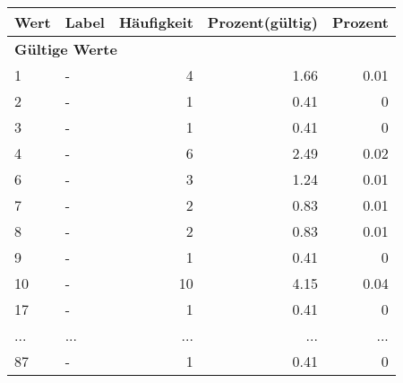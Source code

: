      \begin{longtable}{lXrrr}
     \toprule
     \textbf{Wert} & \textbf{Label} & \textbf{Häufigkeit} & \textbf{Prozent(gültig)} & \textbf{Prozent} \\
     \endhead
     \midrule
     \multicolumn{5}{l}{\textbf{Gültige Werte}}\\
        1 & \multicolumn{1}{X}{-} & %
          \num{4} &
          \num[round-mode=places,round-precision=2]{1,66} &
          \num[round-mode=places,round-precision=2]{0,01} \\
        2 & \multicolumn{1}{X}{-} & %
          \num{1} &
          \num[round-mode=places,round-precision=2]{0,41} &
          \num[round-mode=places,round-precision=2]{0} \\
        3 & \multicolumn{1}{X}{-} & %
          \num{1} &
          \num[round-mode=places,round-precision=2]{0,41} &
          \num[round-mode=places,round-precision=2]{0} \\
        4 & \multicolumn{1}{X}{-} & %
          \num{6} &
          \num[round-mode=places,round-precision=2]{2,49} &
          \num[round-mode=places,round-precision=2]{0,02} \\
        6 & \multicolumn{1}{X}{-} & %
          \num{3} &
          \num[round-mode=places,round-precision=2]{1,24} &
          \num[round-mode=places,round-precision=2]{0,01} \\
        7 & \multicolumn{1}{X}{-} & %
          \num{2} &
          \num[round-mode=places,round-precision=2]{0,83} &
          \num[round-mode=places,round-precision=2]{0,01} \\
        8 & \multicolumn{1}{X}{-} & %
          \num{2} &
          \num[round-mode=places,round-precision=2]{0,83} &
          \num[round-mode=places,round-precision=2]{0,01} \\
        9 & \multicolumn{1}{X}{-} & %
          \num{1} &
          \num[round-mode=places,round-precision=2]{0,41} &
          \num[round-mode=places,round-precision=2]{0} \\
        10 & \multicolumn{1}{X}{-} & %
          \num{10} &
          \num[round-mode=places,round-precision=2]{4,15} &
          \num[round-mode=places,round-precision=2]{0,04} \\
        17 & \multicolumn{1}{X}{-} & %
          \num{1} &
          \num[round-mode=places,round-precision=2]{0,41} &
          \num[round-mode=places,round-precision=2]{0} \\
       ... & ... & ... & ... & ... \\
        87 & \multicolumn{1}{X}{-} & %
          \num{1} &
          \num[round-mode=places,round-precision=2]{0,41} &
          \num[round-mode=places,round-precision=2]{0} \\


\end{longtable}
